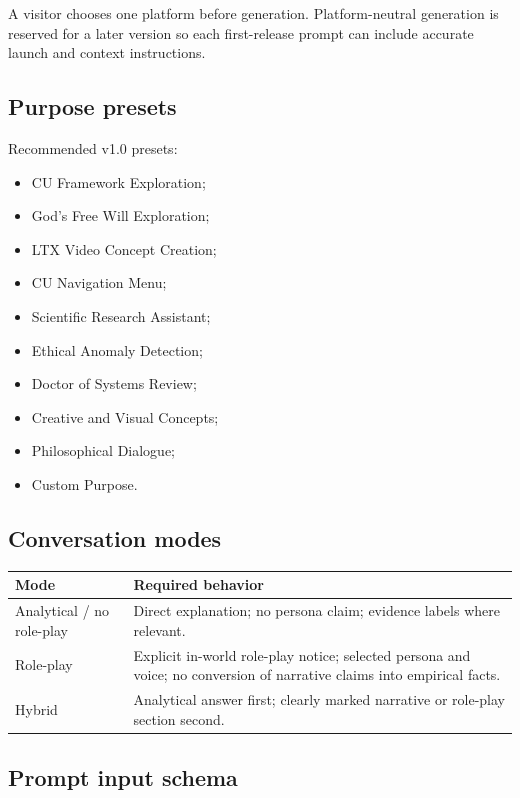 \documentclass[11pt,letterpaper]{article}
\begin{document}
A visitor chooses one platform before generation. Platform-neutral generation is
reserved for a later version so each first-release prompt can include accurate
launch and context instructions.

\subsection{Purpose presets}

Recommended v1.0 presets:

\begin{itemize}
    \item CU Framework Exploration;
    \item God's Free Will Exploration;
    \item LTX Video Concept Creation;
    \item CU Navigation Menu;
    \item Scientific Research Assistant;
    \item Ethical Anomaly Detection;
    \item Doctor of Systems Review;
    \item Creative and Visual Concepts;
    \item Philosophical Dialogue;
    \item Custom Purpose.
\end{itemize}

\subsection{Conversation modes}

\begin{tabularx}{\textwidth}{L{1.65in}Y}
\toprule
\textbf{Mode} & \textbf{Required behavior} \\
\midrule
Analytical / no role-play & Direct explanation; no persona claim; evidence labels where relevant. \\
Role-play & Explicit in-world role-play notice; selected persona and voice; no conversion of narrative claims into empirical facts. \\
Hybrid & Analytical answer first; clearly marked narrative or role-play section second. \\
\bottomrule
\end{tabularx}

\subsection{Prompt input schema}
\end{document}
